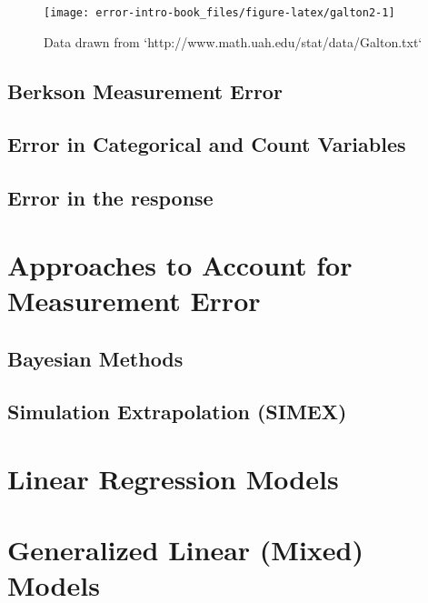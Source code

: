 \documentclass[]{book}
\theoremstyle{definition}
\theoremstyle{definition}
\theoremstyle{definition}
\theoremstyle{remark}
\begin{document}
\begin{figure}

{\centering \texttt{[image: error-intro-book\_files/figure-latex/galton2-1]} 

}

\caption{Data drawn from `http://www.math.uah.edu/stat/data/Galton.txt`}\label{fig:galton2}
\end{figure}

\citep{fuller1987, galton1886}

\section{Berkson Measurement Error}\label{berkson-measurement-error-1}

\section{Error in Categorical and Count
Variables}\label{error-in-categorical-and-count-variables}

\section{Error in the response}\label{error-in-the-response}

\chapter{Approaches to Account for Measurement
Error}\label{approaches-to-account-for-measurement-error}

\section{Bayesian Methods}\label{bayesian-methods}

\section{Simulation Extrapolation
(SIMEX)}\label{simulation-extrapolation-simex}

\chapter{Linear Regression Models}\label{LinReg}

\chapter{Generalized Linear (Mixed) Models}\label{GLMMs}
\end{document}
